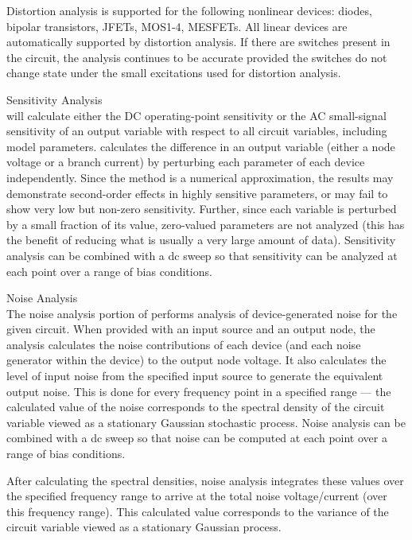 \begin{description}
Distortion analysis is supported for the following nonlinear devices: 
diodes, bipolar transistors, JFETs, MOS1-4, MESFETs.  All linear
devices are automatically supported by distortion analysis.  If there
are switches present in the circuit, the analysis continues to be
accurate provided the switches do not change state under the small
excitations used for distortion analysis.

\item{Sensitivity Analysis}\\
{\WRspice} will calculate either the DC operating-point sensitivity or
the AC small-signal sensitivity of an output variable with respect to
all circuit variables, including model parameters.  {\WRspice} calculates
the difference in an output variable (either a node voltage or a
branch current) by perturbing each parameter of each device
independently.  Since the method is a numerical approximation, the
results may demonstrate second-order effects in highly sensitive
parameters, or may fail to show very low but non-zero sensitivity. 
Further, since each variable is perturbed by a small fraction of its
value, zero-valued parameters are not analyzed (this has the benefit
of reducing what is usually a very large amount of data).  Sensitivity
analysis can be combined with a dc sweep so that sensitivity can be
analyzed at each point over a range of bias conditions.

\item{Noise Analysis}\\
The noise analysis portion of {\WRspice} performs analysis of
device-generated noise for the given circuit.  When provided with an
input source and an output node, the analysis calculates the noise
contributions of each device (and each noise generator within the
device) to the output node voltage.  It also calculates the level of
input noise from the specified input source to generate the equivalent
output noise.  This is done for every frequency point in a specified
range --- the calculated value of the noise corresponds to the spectral
density of the circuit variable viewed as a stationary Gaussian
stochastic process.  Noise analysis can be combined with a dc sweep
so that noise can be computed at each point over a range of bias
conditions.

After calculating the spectral densities, noise analysis integrates
these values over the specified frequency range to arrive at the total
noise voltage/current (over this frequency range).  This calculated
value corresponds to the variance of the circuit variable viewed as a
stationary Gaussian process.


\end{description}
